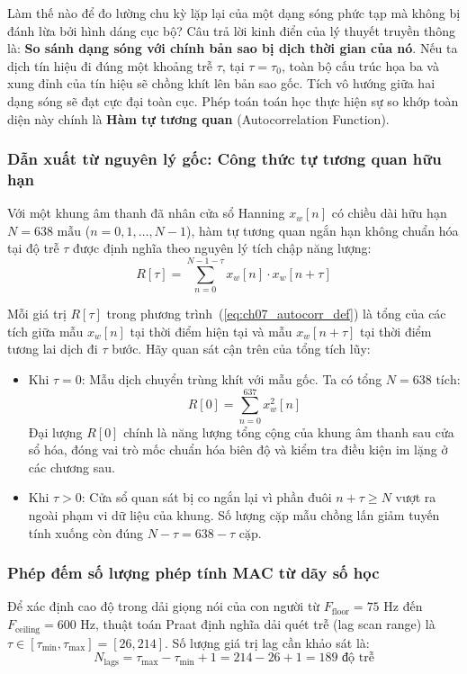 Làm thế nào để đo lường chu kỳ lặp lại của một dạng sóng phức tạp mà không bị đánh lừa bởi hình dáng cục bộ? Câu trả lời kinh điển của lý thuyết truyền thông là: \textbf{So sánh dạng sóng với chính bản sao bị dịch thời gian của nó}. Nếu ta dịch tín hiệu đi đúng một khoảng trễ $\tau$, tại $\tau = \tau_0$, toàn bộ cấu trúc họa ba và xung đỉnh của tín hiệu sẽ chồng khít lên bản sao gốc. Tích vô hướng giữa hai dạng sóng sẽ đạt cực đại toàn cục. Phép toán toán học thực hiện sự so khớp toàn diện này chính là \textbf{Hàm tự tương quan} (Autocorrelation Function).

\subsubsection*{Dẫn xuất từ nguyên lý gốc: Công thức tự tương quan hữu hạn}
Với một khung âm thanh đã nhân cửa sổ Hanning $x_w[n]$ có chiều dài hữu hạn $N = 638\text{ mẫu}$ ($n = 0, 1, \dots, N-1$), hàm tự tương quan ngắn hạn không chuẩn hóa tại độ trễ $\tau$ được định nghĩa theo nguyên lý tích chập năng lượng:
\begin{equation}
R[\tau] = \sum_{n=0}^{N-1-\tau} x_w[n] \cdot x_w[n+\tau]
\label{eq:ch07_autocorr_def}
\end{equation}

Mỗi giá trị $R[\tau]$ trong phương trình~(\ref{eq:ch07_autocorr_def}) là tổng của các tích giữa mẫu $x_w[n]$ tại thời điểm hiện tại và mẫu $x_w[n+\tau]$ tại thời điểm tương lai dịch đi $\tau$ bước. Hãy quan sát cận trên của tổng tích lũy:
\begin{itemize}[leftmargin=1.5em, itemsep=2pt]
    \item Khi $\tau = 0$: Mẫu dịch chuyển trùng khít với mẫu gốc. Ta có tổng $N = 638\text{ tích}$:
    \begin{equation}
    R[0] = \sum_{n=0}^{637} x_w^2[n]
    \end{equation}
    Đại lượng $R[0]$ chính là năng lượng tổng cộng của khung âm thanh sau cửa sổ hóa, đóng vai trò mốc chuẩn hóa biên độ và kiểm tra điều kiện im lặng ở các chương sau.
    \item Khi $\tau > 0$: Cửa sổ quan sát bị co ngắn lại vì phần đuôi $n+\tau \ge N$ vượt ra ngoài phạm vi dữ liệu của khung. Số lượng cặp mẫu chồng lấn giảm tuyến tính xuống còn đúng $N - \tau = 638 - \tau\text{ cặp}$.
\end{itemize}

\subsubsection*{Phép đếm số lượng phép tính MAC từ dãy số học}
Để xác định cao độ trong dải giọng nói của con người từ $F_{\text{floor}} = 75\text{ Hz}$ đến $F_{\text{ceiling}} = 600\text{ Hz}$, thuật toán Praat định nghĩa dải quét trễ (lag scan range) là $\tau \in [\tau_{\min}, \tau_{\max}] = [26, 214]$. Số lượng giá trị lag cần khảo sát là:
\begin{equation}
N_{\text{lags}} = \tau_{\max} - \tau_{\min} + 1 = 214 - 26 + 1 = 189\text{ độ trễ}
\end{equation}

